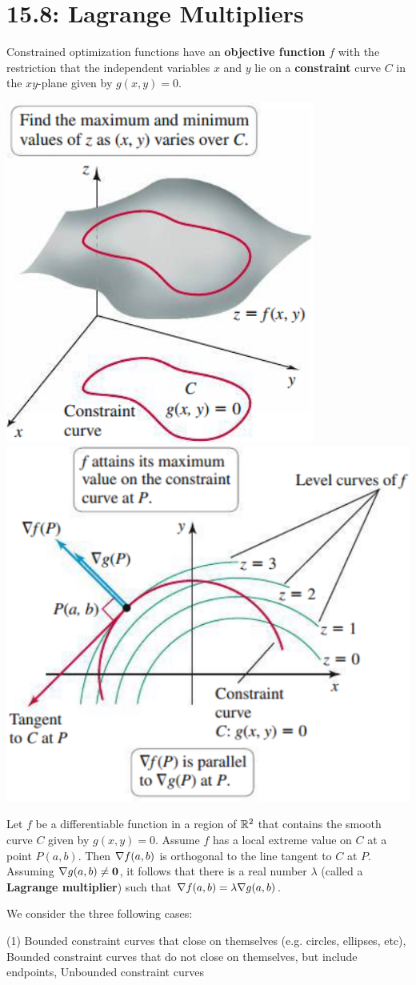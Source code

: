 \documentclass[../mathNotesPreamble]{subfiles}
\begin{document}
\section{15.8: Lagrange Multipliers}
  Constrained optimization functions have an \textbf{objective function} $f$ with the restriction that the independent variables $x$ and $y$ lie on a \textbf{constraint} curve $C$ in the $xy$-plane given by $g(x,y)=0$.

  \begin{center}
    \includegraphics[width=0.3\linewidth]{../images/briggs_15_08/fig15_79}
    \hspace*{20mm}
    \includegraphics[width=0.375\linewidth]{../images/briggs_15_08/fig15_80}
  \end{center}

  \begin{defn*}
    Let $f$ be a differentiable function in a region of $\mathbb{R}^2$ that contains the smooth curve $C$ given by $g(x,y)=0$. Assume $f$ has a local extreme value on $C$ at a point $P(a,b)$. Then $\nabla f(a,b)$ is orthogonal to the line tangent to $C$ at $P$. Assuming $\nabla g(a,b)\neq \mathbf{0}$, it follows that there is a real number $\lambda$ (called a \textbf{Lagrange multiplier}) such that $\nabla f(a,b)=\lambda \nabla g(a,b)$.
  \end{defn*}

  We consider the three following cases:
  \begin{tasks}[label=\textbullet](1)
    \task 
      Bounded constraint curves that close on themselves (e.g. circles, ellipses, etc),
    \task 
      Bounded constraint curves that do not close on themselves, but include endpoints,
    \task 
      Unbounded constraint curves
  \end{tasks}
  \pagebreak
\end{document}
